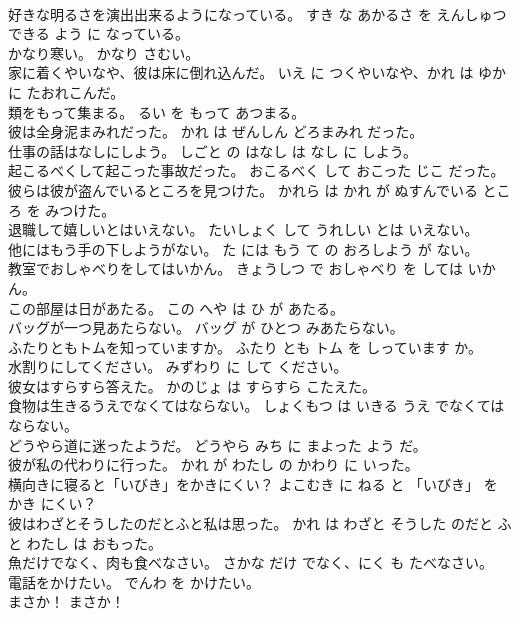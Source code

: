 \documentclass[8pt]{extreport}
\begin{document}
\begin{CJK}{UTF8}{min}
\\	好きな明るさを演出出来るようになっている。	すき な あかるさ を えんしゅつ できる よう に なっている。	
\\	かなり寒い。	かなり さむい。	
\\	家に着くやいなや、彼は床に倒れ込んだ。	いえ に つくやいなや、かれ は ゆか に たおれこんだ。	
\\	類をもって集まる。	るい を もって あつまる。	
\\	彼は全身泥まみれだった。	かれ は ぜんしん どろまみれ だった。	
\\	仕事の話はなしにしよう。	しごと の はなし は なし に しよう。	
\\	起こるべくして起こった事故だった。	おこるべく して おこった じこ だった。	
\\	彼らは彼が盗んでいるところを見つけた。	かれら は かれ が ぬすんでいる ところ を みつけた。	
\\	退職して嬉しいとはいえない。	たいしょく して うれしい とは いえない。	
\\	他にはもう手の下しようがない。	た には もう て の おろしよう が ない。	
\\	教室でおしゃべりをしてはいかん。	きょうしつ で おしゃべり を しては いかん。	
\\	この部屋は日があたる。	この へや は ひ が あたる。	
\\	バッグが一つ見あたらない。	バッグ が ひとつ みあたらない。	
\\	ふたりともトムを知っていますか。	ふたり とも トム を しっています か。	
\\	水割りにしてください。	みずわり に して ください。	
\\	彼女はすらすら答えた。	かのじょ は すらすら こたえた。	
\\	食物は生きるうえでなくてはならない。	しょくもつ は いきる うえ でなくては ならない。	
\\	どうやら道に迷ったようだ。	どうやら みち に まよった よう だ。	
\\	彼が私の代わりに行った。	かれ が わたし の かわり に いった。	
\\	横向きに寝ると「いびき」をかきにくい？	よこむき に ねる と 「いびき」 を かき にくい？	
\\	彼はわざとそうしたのだとふと私は思った。	かれ は わざと そうした のだと ふと わたし は おもった。	
\\	魚だけでなく、肉も食べなさい。	さかな だけ でなく、にく も たべなさい。	
\\	電話をかけたい。	でんわ を かけたい。	
\\	まさか！	まさか！	

\end{CJK}
\end{document}
